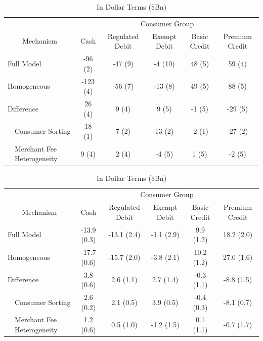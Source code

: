 \documentclass[11pt,english]{article}
\theoremstyle{remark}
\begin{document}
\clearpage

\begin{table}[H]
  \centering
  \caption{Effects of Capping Interchange Fees}
  \label{tab:redist}

  
    \centering
    \caption{As Basis Points of Baseline Consumption}
    \label{tab:redist-se-bps}
    
    \begin{tabular}{l l
                    c c
                    c c
                    c}
      \hline
       &  & \multicolumn{5}{c}{Consumer Group} \\
      \multicolumn{2}{c}{Mechanism} & Cash & Regulated Debit & Exempt Debit & Basic Credit & Premium Credit \\
      \hline
      \multicolumn{2}{l}{Full Model} & -96 (2) & -47 (9) & -4 (10) & 48 (5) & 59 (4) \\
      \multicolumn{2}{l}{Homogeneous} & -123 (4) & -56 (7) & -13 (8) & 49 (5) & 88 (5) \\
      \hline
      \multicolumn{2}{l}{Difference} & 26 (4) & 9 (4) & 9 (5) & -1 (5) & -29 (5) \\
       & Consumer Sorting & 18 (1) & 7 (2) & 13 (2) & -2 (1) & -27 (2) \\
       & Merchant Fee Heterogeneity & 9 (4) & 2 (4) & -4 (5) & 1 (5) & -2 (5) \\
      \hline
    \end{tabular}
  

  \vspace{0.8em}

  
    \centering
    \caption{In Dollar Terms (\$Bn)}
    \label{tab:redist-se-dollars}
    
    \begin{tabular}{l l
                    c c
                    c c
                    c}
      \hline
       &  & \multicolumn{5}{c}{Consumer Group} \\
      \multicolumn{2}{c}{Mechanism} & Cash & Regulated Debit & Exempt Debit & Basic Credit & Premium Credit \\
      \hline
      \multicolumn{2}{l}{Full Model} & -13.9 (0.3) & -13.1 (2.4) & -1.1 (2.9) & 9.9 (1.2) & 18.2 (2.0) \\
      \multicolumn{2}{l}{Homogeneous} & -17.7 (0.6) & -15.7 (2.0) & -3.8 (2.1) & 10.2 (1.2) & 27.0 (1.6) \\
      \hline
      \multicolumn{2}{l}{Difference} & 3.8 (0.6) & 2.6 (1.1) & 2.7 (1.4) & -0.3 (1.1) & -8.8 (1.5) \\
       & Consumer Sorting & 2.6 (0.2) & 2.1 (0.5) & 3.9 (0.5) & -0.4 (0.3) & -8.1 (0.7) \\
       & Merchant Fee Heterogeneity & 1.2 (0.6) & 0.5 (1.0) & -1.2 (1.5) & 0.1 (1.1) & -0.7 (1.7) \\
      \hline
    \end{tabular}
  


\end{table}
\end{document}
